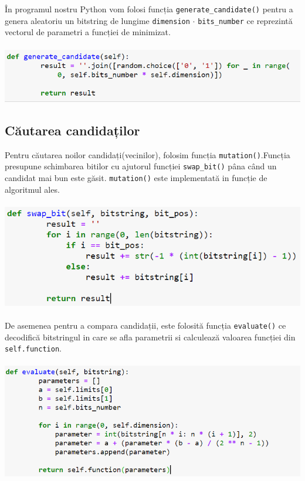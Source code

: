 \documentclass{article}
\begin{document}
În programul nostru Python vom folosi funcția \texttt{generate\_candidate()} pentru a genera aleatoriu un bitstring de lungime \texttt{dimension} $\cdot$ \texttt{bits\_number} ce reprezintă vectorul de parametri a funcției de minimizat.\\\\
\includegraphics[width=\textwidth]{3c}

\subsection{Căutarea candidaților}
Pentru căutarea noilor candidați(vecinilor), folosim funcția \texttt{mutation()}.Funcția presupune schimbarea bitilor cu ajutorul funcției \texttt{swap\_bit()} pâna când un candidat mai bun este găsit. \texttt{mutation()} este implementată in funcție de algoritmul ales.\\\\
\includegraphics[width=\textwidth]{3f}\\\\
De asemenea pentru a compara candidații, este folosită funcția \texttt{evaluate()} ce decodifică bitstringul in care se afla parametrii si calculează valoarea funcției din \texttt{self.function}.\\\\
\includegraphics[width=\textwidth]{3g}
\end{document}
